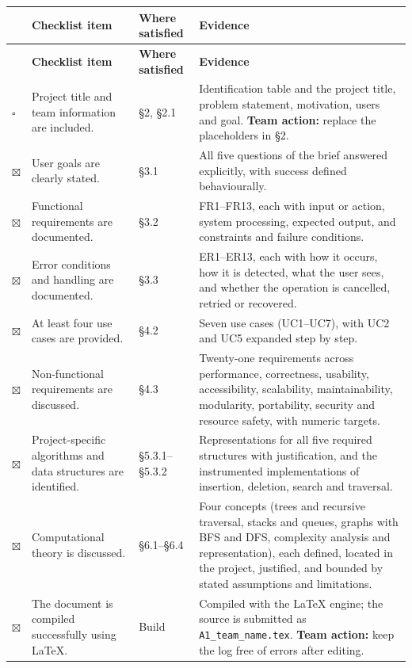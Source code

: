 \documentclass[11pt,a4paper]{article}
\newcommand{\ct}[1]{\texttt{#1}}
\begin{document}
{\small
\setlength{\tabcolsep}{4pt}
\begin{longtable}{@{}C{0.7cm}L{6.6cm}L{2.6cm}L{5.2cm}@{}}
\toprule
& \textbf{Checklist item} & \textbf{Where satisfied} & \textbf{Evidence} \\
\midrule
\endfirsthead
\toprule
& \textbf{Checklist item} & \textbf{Where satisfied} & \textbf{Evidence} \\
\midrule
\endhead
\bottomrule
\endlastfoot

$\square$ & Project title and team information are included. &
\S2, \S2.1 & Identification table and the project title, problem statement, motivation,
users and goal. \textbf{Team action:} replace the placeholders in \S2. \\

$\boxtimes$ & User goals are clearly stated. &
\S3.1 & All five questions of the brief answered explicitly, with success defined
behaviourally. \\

$\boxtimes$ & Functional requirements are documented. &
\S3.2 & FR1--FR13, each with input or action, system processing, expected output, and
constraints and failure conditions. \\

$\boxtimes$ & Error conditions and handling are documented. &
\S3.3 & ER1--ER13, each with how it occurs, how it is detected, what the user sees, and
whether the operation is cancelled, retried or recovered. \\

$\boxtimes$ & At least four use cases are provided. &
\S4.2 & Seven use cases (UC1--UC7), with UC2 and UC5 expanded step by step. \\

$\boxtimes$ & Non-functional requirements are discussed. &
\S4.3 & Twenty-one requirements across performance, correctness, usability, accessibility,
scalability, maintainability, modularity, portability, security and resource safety, with
numeric targets. \\

$\boxtimes$ & Project-specific algorithms and data structures are identified. &
\S5.3.1--\S5.3.2 & Representations for all five required structures with justification, and
the instrumented implementations of insertion, deletion, search and traversal. \\

$\boxtimes$ & Computational theory is discussed. &
\S6.1--\S6.4 & Four concepts (trees and recursive traversal, stacks and queues, graphs with
BFS and DFS, complexity analysis and representation), each defined, located in the project,
justified, and bounded by stated assumptions and limitations. \\
\midrule
$\boxtimes$ & The document is compiled successfully using \LaTeX. &
Build & Compiled with the \LaTeX{} engine; the source is submitted as
\ct{A1\_team\_name.tex}. \textbf{Team action:} keep the log free of errors after editing. \\


\end{longtable}}
\end{document}
